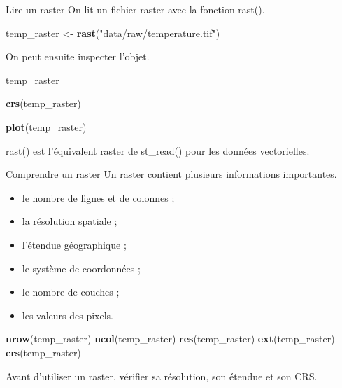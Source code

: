 \documentclass[
  10pt,
  ignorenonframetext,
]{beamer}
\newenvironment{Shaded}{\begin{snugshade}}{\end{snugshade}}
\newcommand{\FunctionTok}[1]{\textcolor[rgb]{0.13,0.29,0.53}{\textbf{#1}}}
\newcommand{\NormalTok}[1]{#1}
\newcommand{\OtherTok}[1]{\textcolor[rgb]{0.56,0.35,0.01}{#1}}
\newcommand{\StringTok}[1]{\textcolor[rgb]{0.31,0.60,0.02}{#1}}
\begin{document}
\begin{frame}[fragile]{Lire un raster}
\label{lire-un-raster}
On lit un fichier raster avec la fonction rast().

\begin{Shaded}
\begin{Highlighting}[]
\NormalTok{temp\_raster }\OtherTok{\textless{}{-}} \FunctionTok{rast}\NormalTok{(}\StringTok{"data/raw/temperature.tif"}\NormalTok{)}
\end{Highlighting}
\end{Shaded}

On peut ensuite inspecter l'objet.

\begin{Shaded}
\begin{Highlighting}[]
\NormalTok{temp\_raster}

\FunctionTok{crs}\NormalTok{(temp\_raster)}

\FunctionTok{plot}\NormalTok{(temp\_raster)}
\end{Highlighting}
\end{Shaded}

rast() est l'équivalent raster de st\_read() pour les données
vectorielles.
\end{frame}

\begin{frame}[fragile]{Comprendre un raster}
\label{comprendre-un-raster}
Un raster contient plusieurs informations importantes.

\begin{itemize}
  \item le nombre de lignes et de colonnes ;
  \item la résolution spatiale ;
  \item l’étendue géographique ;
  \item le système de coordonnées ;
  \item le nombre de couches ;
  \item les valeurs des pixels.
\end{itemize}

\begin{Shaded}
\begin{Highlighting}[]
\FunctionTok{nrow}\NormalTok{(temp\_raster)}
\FunctionTok{ncol}\NormalTok{(temp\_raster)}
\FunctionTok{res}\NormalTok{(temp\_raster)}
\FunctionTok{ext}\NormalTok{(temp\_raster)}
\FunctionTok{crs}\NormalTok{(temp\_raster)}
\end{Highlighting}
\end{Shaded}

Avant d'utiliser un raster, vérifier sa résolution, son étendue et son
CRS.
\end{frame}
\end{document}

